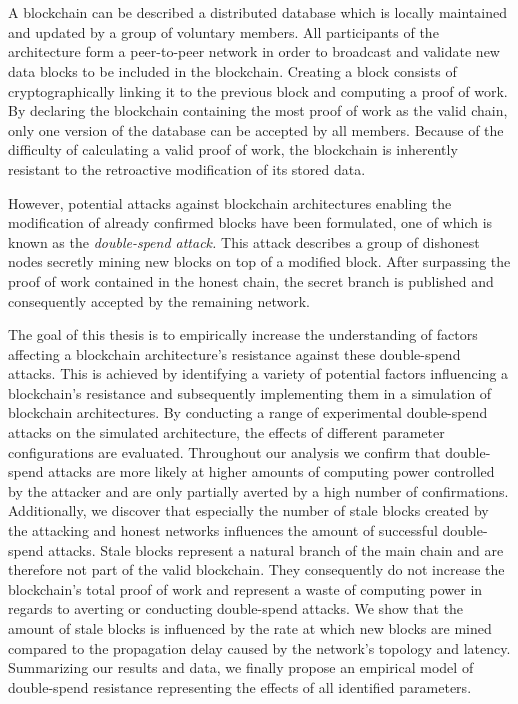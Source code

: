 \documentclass[a4paper,12pt,twoside]{report}
\makeatletter
\renewenvironment{abstract}{%
  \if@twocolumn
    \section*{\abstractname}%
  \else
    \small
    \begin{center}%
      {\bfseries \abstractname\vspace{-.1em}\vspace{\z@}}%
    \end{center}%
    \quotation
  \fi}
  {\if@twocolumn\else\endquotation\fi}
\makeatother
\begin{document}
\begin{abstract}
A blockchain can be described a distributed database which is locally maintained and updated by a group of voluntary members. All participants of the architecture form a peer-to-peer network in order to broadcast and validate new data blocks to be included in the blockchain. Creating a block consists of cryptographically linking it to the previous block and computing a proof of work. By declaring the blockchain containing the most proof of work as the valid chain, only one version of the database can be accepted by all members. Because of the difficulty of calculating a valid proof of work, the blockchain is inherently resistant to the retroactive modification of its stored data. 

However, potential attacks against blockchain architectures enabling the modification of already confirmed blocks have been formulated, one of which is known as the \textit{double-spend attack.} This attack describes a group of dishonest nodes secretly mining new blocks on top of a modified block. After surpassing the proof of work contained in the honest chain, the secret branch is published and consequently accepted by the remaining network. 

The goal of this thesis is to empirically increase the understanding of factors affecting a blockchain architecture's resistance against these double-spend attacks. This is achieved by identifying a variety of potential factors influencing a blockchain's resistance and subsequently implementing them in a simulation of blockchain architectures. By conducting a range of experimental double-spend attacks on the simulated architecture, the effects of different parameter configurations are evaluated. Throughout our analysis we confirm that double-spend attacks are more likely at higher amounts of computing power controlled by the attacker and are only partially averted by a high number of confirmations. Additionally, we discover that especially the number of stale blocks created by the attacking and honest networks influences the amount of successful double-spend attacks. Stale blocks represent a natural branch of the main chain and are therefore not part of the valid blockchain. They consequently do not increase the blockchain's total proof of work and represent a waste of computing power in regards to averting or conducting double-spend attacks. We show that the amount of stale blocks is influenced by the rate at which new blocks are mined compared to the propagation delay caused by the network's topology and latency. Summarizing our results and data, we finally propose an empirical model of double-spend resistance representing the effects of all identified parameters.
\end{abstract}
\end{document}
